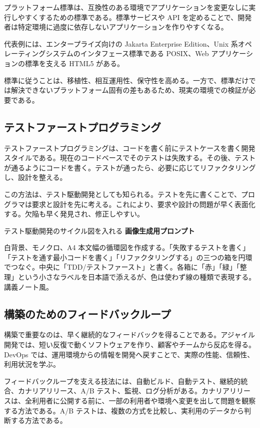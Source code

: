 \documentclass[a4paper,11pt,ja=standard,xelatex]{bxjsarticle}
\begin{document}
プラットフォーム標準は、互換性のある環境でアプリケーションを変更なしに実行しやすくするための標準である。標準サービスや API を定めることで、開発者は特定環境に過度に依存しないアプリケーションを作りやすくなる。

代表例には、エンタープライズ向けの Jakarta Enterprise Edition、Unix 系オペレーティングシステムのインタフェース標準である POSIX、Web アプリケーションの標準を支える HTML5 がある。

標準に従うことは、移植性、相互運用性、保守性を高める。一方で、標準だけでは解決できないプラットフォーム固有の差もあるため、現実の環境での検証が必要である。

\subsection{テストファーストプログラミング}

テストファーストプログラミングは、コードを書く前にテストケースを書く開発スタイルである。現在のコードベースでそのテストは失敗する。その後、テストが通るようにコードを書く。テストが通ったら、必要に応じてリファクタリングし、設計を整える。

この方法は、テスト駆動開発としても知られる。テストを先に書くことで、プログラマは要求と設計を先に考える。これにより、要求や設計の問題が早く表面化する。欠陥も早く発見され、修正しやすい。

\begin{todobox}{テスト駆動開発のサイクル図を入れる}
\textbf{画像生成用プロンプト}

白背景、モノクロ、A4 本文幅の循環図を作成する。「失敗するテストを書く」「テストを通す最小コードを書く」「リファクタリングする」の三つの箱を円環でつなぐ。中央に「TDD/テストファースト」と書く。各箱に「赤」「緑」「整理」という小さなラベルを日本語で添えるが、色は使わず線の種類で表現する。講義ノート風。
\end{todobox}

\subsection{構築のためのフィードバックループ}

構築で重要なのは、早く継続的なフィードバックを得ることである。アジャイル開発では、短い反復で動くソフトウェアを作り、顧客やチームから反応を得る。DevOps では、運用環境からの情報を開発へ戻すことで、実際の性能、信頼性、利用状況を学ぶ。

フィードバックループを支える技法には、自動ビルド、自動テスト、継続的統合、カナリアリリース、A/B テスト、監視、ログ分析がある。カナリアリリースは、全利用者に公開する前に、一部の利用者や環境へ変更を出して問題を観察する方法である。A/B テストは、複数の方式を比較し、実利用のデータから判断する方法である。
\end{document}
